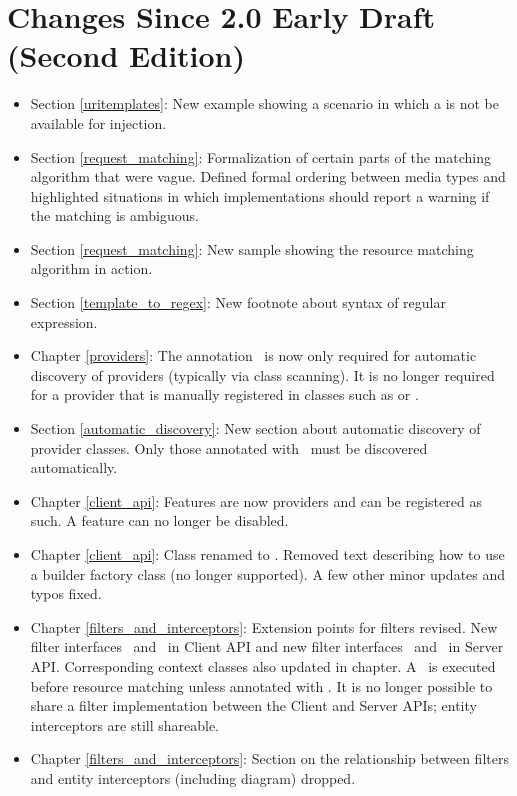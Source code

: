 \section{Changes Since 2.0 Early Draft (Second Edition)}

\begin{itemize}
\item Section \ref{uritemplates}: New example showing a scenario in which a  is not be available for injection. 
\item Section \ref{request_matching}: Formalization of certain parts of the matching algorithm that were vague. Defined formal ordering between media types and highlighted situations in which implementations should report a warning if the matching is ambiguous. 
\item Section \ref{request_matching}: New sample showing the resource matching algorithm in action.
\item Section \ref{template_to_regex}: New footnote about syntax of regular expression.
\item Chapter \ref{providers}: The annotation \Provider\ is now only required for automatic discovery of providers (typically via class scanning). It is no longer required for a provider that is manually registered in classes such as  or .
\item Section \ref{automatic_discovery}: New section about automatic discovery of provider classes. Only those annotated with \Provider\ must be discovered automatically.
\item Chapter \ref{client_api}: Features are now providers and can be registered as such. A feature can no longer be disabled.
\item Chapter \ref{client_api}: Class  renamed to \WebTarget. Removed text describing how to use a builder factory class (no longer supported). A few other minor updates and typos fixed.
\item Chapter \ref{filters_and_interceptors}: Extension points for filters revised. New filter interfaces \ClientRequestFilter\ and \ClientResponseFilter\ in Client API and new filter interfaces \ContainerRequestFilter\ and \ContainerResponseFilter\ in Server API. Corresponding context classes also updated in chapter. A \ContainerRequestFilter\ is executed before resource matching unless annotated with \PostMatching. It is no longer possible to share a filter implementation between the Client and Server APIs; entity interceptors are still shareable.
\item Chapter \ref{filters_and_interceptors}: Section on the relationship between filters and entity interceptors (including diagram) dropped.

\end{itemize}
